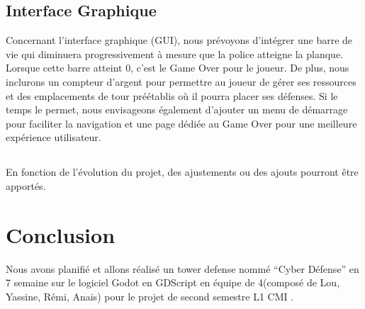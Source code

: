 \documentclass{article}
\begin{document}
\subsection*{Interface Graphique}
Concernant l'interface graphique (GUI), nous prévoyons d'intégrer une barre de vie qui diminuera progressivement à mesure que la police atteigne la planque. Lorsque cette barre atteint 0, c'est le Game Over pour le joueur. De plus, nous inclurons un compteur d'argent pour permettre au joueur de gérer ses ressources et des emplacements de tour préétablis où il pourra placer ses défenses. Si le temps le permet, nous envisageons également d'ajouter un menu de démarrage pour faciliter la navigation et une page dédiée au Game Over pour une meilleure expérience utilisateur.
\subsection*{}
En fonction de l'évolution du projet, des ajustements ou des ajouts pourront être apportés.

\section*{Conclusion}
Nous avons planifié et allons réalisé un tower defense nommé “Cyber Défense” en 7 semaine sur le logiciel Godot en GDScript en équipe de 4(composé de Lou, Yassine, Rémi, Anais) pour le projet de second semestre L1 CMI .

\noindent 


\end{document}
